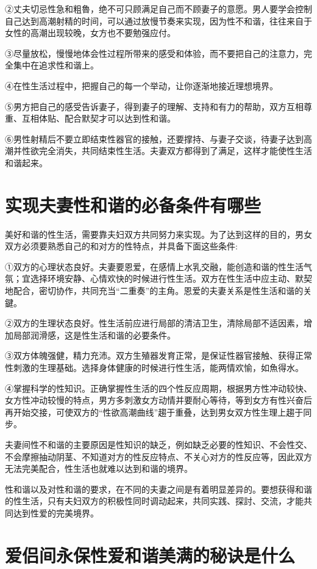 \documentclass[12pt,UTF8]{ctexbook}
\begin{document}
②丈夫切忌性急和粗魯，绝不可只顾满足自己而不顾妻子的意愿。男人要学会控制自己达到高潮射精的时间，可以通过放慢节奏来实现，因为性不和谐，往往来自于女性的高潮出现较晚，女方也不要勉强应付。

③尽量放松，慢慢地体会性过程所带来的感受和体验，而不要把自己的注意力，完全集中在追求性和谐上。

④在性生活过程中，把握自己的每一个举动，让你逐渐地接近理想境界。

⑤男方把自己的感受告诉妻子，得到妻子的理解、支持和有力的帮助，双方互相尊重、互相体贴、配合默契才可以达到性和谐。

⑥男性射精后不要立即结束性器官的接触，还要撑持、与妻子交谈，待妻子达到高潮并性欲完全消失，共同结束性生活。夫妻双方都得到了满足，这样才能使性生活和谐起来。

\section{实现夫妻性和谐的必备条件有哪些}

美好和谐的性生活，需要靠夫妇双方共同努力来实现。为了达到这样的目的，男女双方必须要熟悉自己的和对方的性特点，并具备下面这些条件:

①双方的心理状态良好。夫妻要恩爱，在感情上水乳交融，能创造和谐的性生活气氛；宜选择环境安静、心情欢快的时候进行性生活。双方在性生活中应主动、默契地配合，密切协作，共同充当“二重奏”的主角。恩爱的夫妻关系是性生活和谐的关鍵。

②双方的生理状态良好。性生活前应进行局部的清洁卫生，清除局部不适因素，增加局部润滑感，这是性生活和谐的必要条件。

③双方体魄强健，精力充沛。双方生殖器发育正常，是保证性器官接触、获得正常性刺激的生理基础。选择身体健康的时候进行性生活，能两情欢愉，如魚得水。

④掌握科学的性知识。正确掌握性生活的四个性反应周期，根据男方性冲动较快、女方性冲动较慢的特点，男方多刺激女方动情并要耐心等待，等到女方有性兴奋后再开始交接，可使双方的“性欲高潮曲线”趨于重叠，达到男女双方性生理上趨于同步。

夫妻间性不和谐的主要原因是性知识的缺乏，例如缺乏必要的性知识、不会性交、不会摩擦抽动阴茎、不知道对方的性反应特点、不关心对方的性反应等，因此双方无法完美配合，性生活也就难以达到和谐的境界。

性和谐以及对性和谐的要求，在不同的夫妻之间是有着明显差异的。要想获得和谐的性生活，只有夫妇双方的积极性同时调动起来，共同实践、探討、交流，才能共同达到性爱的完美境界。

\section{爱侣间永保性爱和谐美满的秘诀是什么}
\end{document}
